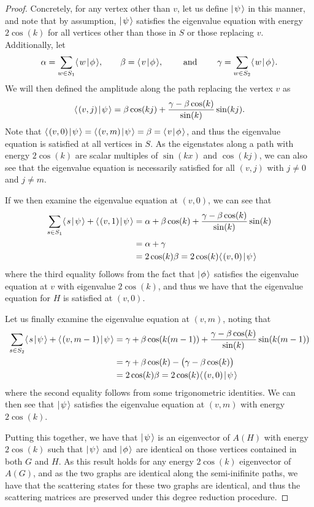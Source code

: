 \documentclass[../thesis-main/thesis-main]{subfiles}
\begin{document}
\begin{proof}
  Concretely, for any vertex other than $v$, let us define $|\mspace{2mu} \psi \mspace{2mu} \rangle$ in this manner, and note that by assumption, $|\mspace{2mu} \psi \mspace{2mu} \rangle$ satisfies the eigenvalue equation with energy $2\cos(k)$ for all vertices other than those in $S$ or those replacing $v$.  Additionally, let 
  \begin{equation}
    \alpha = \sum_{w\in S_1} \langle\mspace{2mu} w \mspace{2mu} | \mspace{2mu} \phi\mspace{2mu} \rangle, \qquad \beta = \langle\mspace{2mu} v \mspace{2mu} | \mspace{2mu} \phi\mspace{2mu} \rangle, \qquad \text{ and } \qquad \gamma = \sum_{w\in S_2} \langle\mspace{2mu} w \mspace{2mu} | \mspace{2mu} \phi\mspace{2mu} \rangle.
  \end{equation}
  We will then defined the amplitude along the path replacing the vertex $v$ as
  \begin{equation}
    \langle\mspace{2mu} (v,j) \mspace{2mu} | \mspace{2mu} \psi\mspace{2mu} \rangle = \beta \cos(k j) + \frac{\gamma - \beta\cos(k)}{\sin(k)} \sin( k j).
  \end{equation}
  Note that $\langle\mspace{2mu} (v,0) \mspace{2mu} | \mspace{2mu} \psi\mspace{2mu} \rangle = \langle\mspace{2mu} (v,m) \mspace{2mu} | \mspace{2mu} \psi\mspace{2mu} \rangle = \beta = \langle\mspace{2mu} v \mspace{2mu} | \mspace{2mu} \phi\mspace{2mu} \rangle$, and thus the eigenvalue equation is satisfied at all vertices in $S$.  As the eigenstates along a path with energy $2\cos(k)$ are scalar multiples of $\sin(k x)$ and $\cos(k j)$, we can also see that the eigenvalue equation is necessarily satisfied for all $(v,j)$ with $j\neq 0$ and $j\neq m$.
  
  If we then examine the eigenvalue equation at $(v,0)$, we can see that
  \begin{align}
    \sum_{s\in S_1} \langle\mspace{2mu} s \mspace{2mu} | \mspace{2mu} \psi\mspace{2mu} \rangle + \langle\mspace{2mu} (v,1) \mspace{2mu} | \mspace{2mu} \psi\mspace{2mu} \rangle &= \alpha + \beta \cos(k) + \frac{\gamma - \beta \cos(k)}{\sin(k)} \sin (k) \\
      &= \alpha + \gamma \\
      &= 2 \cos(k) \beta = 2 \cos(k) \langle\mspace{2mu} (v,0) \mspace{2mu} | \mspace{2mu} \psi\mspace{2mu} \rangle
  \end{align}
  where the third equality follows from the fact that $|\mspace{2mu} \phi \mspace{2mu} \rangle$ satisfies the eigenvalue equation at $v$ with eigenvalue $2\cos(k)$, and thus we have that the eigenvalue equation for $H$ is satisfied at $(v,0)$. 
  
  Let us finally examine the eigenvalue equation at $(v,m)$, noting that
  \begin{align}
    \sum_{s\in S_2} \langle\mspace{2mu} s \mspace{2mu} | \mspace{2mu} \psi\mspace{2mu} \rangle + \langle\mspace{2mu} (v,m-1) \mspace{2mu} | \mspace{2mu} \psi\mspace{2mu} \rangle &=\gamma + \beta \cos(k (m-1)) + \frac{\gamma - \beta \cos(k)}{\sin(k)} \sin (k(m-1)) \\
      &= \gamma + \beta \cos(k)   -  \big(\gamma - \beta \cos(k)\big)\\
      &= 2 \cos(k) \beta = 2 \cos(k) \langle\mspace{2mu} (v,0) \mspace{2mu} | \mspace{2mu} \psi\mspace{2mu} \rangle
  \end{align}
  where the second equality follows from some trigonometric identities. We can then see that $|\mspace{2mu} \psi \mspace{2mu} \rangle$ satisfies the eigenvalue equation at $(v,m)$ with energy $2\cos(k)$.
  
  Putting this together, we have that $|\mspace{2mu} \psi \mspace{2mu} \rangle$ is an eigenvector of $A(H)$ with energy $2\cos(k)$ such that $|\mspace{2mu} \psi \mspace{2mu} \rangle$ and $|\mspace{2mu} \phi \mspace{2mu} \rangle$ are identical on those vertices contained in both $G$ and $H$.  As this result holds for any energy $2\cos(k)$ eigenvector of $A(G)$, and as the two graphs are identical along the semi-inifinite paths, we have that the scattering states for these two graphs are identical, and thus the scattering matrices are preserved under this degree reduction procedure.
\end{proof}
\end{document}
